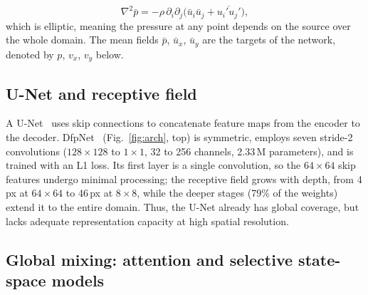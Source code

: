 \documentclass[conference]{IEEEtran}
\begin{document}
\begin{equation}
  \nabla^2 \bar p = -\rho\,\partial_i\partial_j
    \big(\bar u_i\bar u_j + \overline{u_i'u_j'}\big),
  \label{eq:poisson}
\end{equation}
which is elliptic, meaning the pressure at any point depends on the source over the whole domain. The mean fields $\bar p$, $\bar u_x$, $\bar u_y$ are the targets of the network, denoted  by $p$, $v_x$, $v_y$ below.


\subsection{U-Net and receptive field}
\label{sec:unet}

A U-Net~\cite{ronneberger2015} uses skip connections to concatenate feature
maps from the encoder to the decoder. DfpNet~\cite{thuerey2020}
(Fig.~\ref{fig:arch}, top) is symmetric, employs seven stride-2 convolutions
($128\times128$ to $1\times1$, 32 to 256 channels, 2.33\,M parameters), and
is trained with an L1 loss. Its first layer is a single convolution, so the
$64\times64$ skip features undergo minimal processing; the receptive field
grows with depth, from 4\,px at $64\times64$ to 46\,px at $8\times8$, while
the deeper stages (79\% of the weights) extend it to the entire domain. Thus,
the U-Net already has global coverage, but lacks adequate representation capacity at high spatial resolution.


\subsection{Global mixing: attention and selective state-space models}
\label{sec:mixing}
\end{document}
